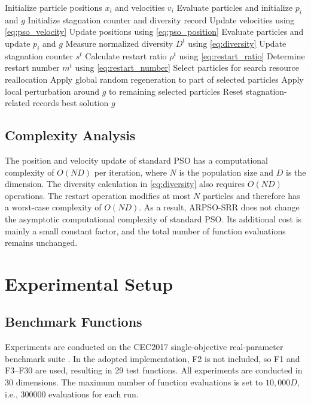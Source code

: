 \documentclass[conference]{IEEEtran}
\begin{document}
\begin{algorithm}[H]
\caption{ARPSO-SRR}
\label{alg:arpso_srr}
\begin{algorithmic}[1]
\State Initialize particle positions $x_i$ and velocities $v_i$
\State Evaluate particles and initialize $p_i$ and $g$
\State Initialize stagnation counter and diversity record
    \State Update velocities using \eqref{eq:pso_velocity}
    \State Update positions using \eqref{eq:pso_position}
    \State Evaluate particles and update $p_i$ and $g$
    \State Measure normalized diversity $D^t$ using \eqref{eq:diversity}
    \State Update stagnation counter $s^t$
        \State Calculate restart ratio $\rho^t$ using \eqref{eq:restart_ratio}
        \State Determine restart number $m^t$ using \eqref{eq:restart_number}
        \State Select particles for search resource reallocation
        \State Apply global random regeneration to part of selected particles
        \State Apply local perturbation around $g$ to remaining selected particles
        \State Reset stagnation-related records
    \EndIf
\EndWhile
\State \Return best solution $g$
\end{algorithmic}
\end{algorithm}


\subsection{Complexity Analysis}
The position and velocity update of standard PSO has a computational complexity of $O(ND)$ per iteration, where $N$ is the population size and $D$ is the dimension. The diversity calculation in \eqref{eq:diversity} also requires $O(ND)$ operations. The restart operation modifies at most $N$ particles and therefore has a worst-case complexity of $O(ND)$. As a result, ARPSO-SRR does not change the asymptotic computational complexity of standard PSO. Its additional cost is mainly a small constant factor, and the total number of function evaluations remains unchanged.

\section{Experimental Setup}\label{sec:experiment}

\subsection{Benchmark Functions}
Experiments are conducted on the CEC2017 single-objective real-parameter benchmark suite \cite{b5}. In the adopted implementation, F2 is not included, so F1 and F3--F30 are used, resulting in 29 test functions. All experiments are conducted in 30 dimensions. The maximum number of function evaluations is set to $10{,}000D$, i.e., 300000 evaluations for each run.
\end{document}
